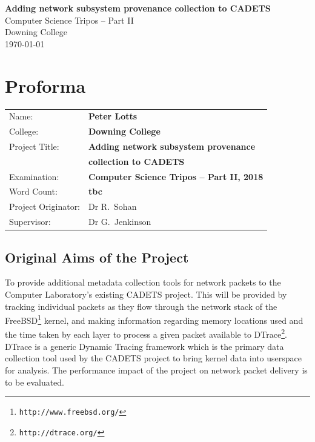 \documentclass[a4paper,12pt,twoside,openright]{report}
\begin{document}
	
	
	
	\pagestyle{empty}
	
	
	\vspace*{60mm}
	\begin{center}
		\Huge
		\textbf{Adding network subsystem provenance collection to CADETS} \\[5mm]
		Computer Science Tripos -- Part II \\[5mm]
		Downing College \\[5mm]
		\today  %
	\end{center}
	
	
	\pagestyle{plain}
	
	\chapter*{Proforma}
	
	{\large
		\begin{tabular}{ll}
			Name:               & \bf Peter Lotts                       \\
			College:            & \bf Downing College                     \\
			Project Title:      & \bf Adding network subsystem provenance \\
								& \bf collection to CADETS \\
			Examination:        & \bf Computer Science Tripos -- Part II, 2018  \\
			Word Count:         & \bf tbc\footnotemark[1]  \\
			Project Originator: & Dr R.~Sohan                    \\
			Supervisor:         & Dr G.~Jenkinson                    \\ 
		\end{tabular}
	}
	
	
	\section*{Original Aims of the Project}
	
	To provide additional metadata collection tools for network packets to the Computer Laboratory's existing CADETS project. This will be provided by tracking individual packets as they flow through the network stack of the FreeBSD\footnote{\texttt{http://www.freebsd.org/}} kernel, and making information regarding memory locations used and the time taken by each layer to process a given packet available to DTrace\footnote{\texttt{http://dtrace.org/}}. DTrace is a generic Dynamic Tracing framework which is the primary data collection tool used by the CADETS project to bring kernel data into userspace for analysis. The performance impact of the project on network packet delivery is to be evaluated.
	
\end{document}

